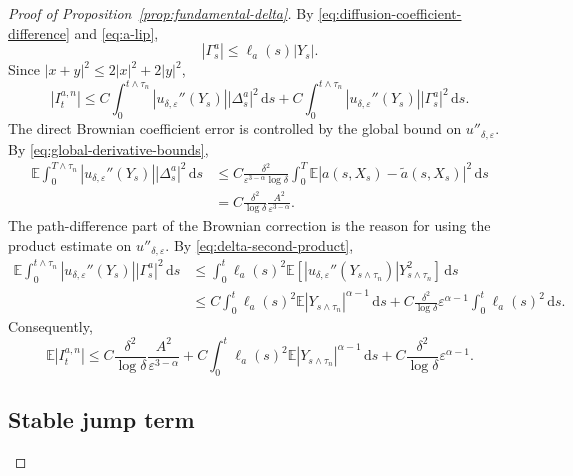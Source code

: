 \documentclass[11pt]{article}
\newcommand{\E}{\mathbb{E}}
\newcommand{\1}{\mathbf{1}}
\newcommand{\dd}{\,\mathrm{d}}
\newcommand{\wt}{\tilde}
\newcommand{\eps}{\varepsilon}
\begin{document}
\begin{proof}[Proof of Proposition~\ref{prop:fundamental-delta}]
By \eqref{eq:diffusion-coefficient-difference} and \eqref{eq:a-lip},
\[
  |\Gamma_s^a|\le \ell_a(s)|Y_s|.
\]
Since $|x+y|^2\le2|x|^2+2|y|^2$,
\[
|I_t^{a,n}|\le C\int_0^{t\wedge\tau_n} |u_{\delta,\eps}''(Y_s)||\Delta_s^a|^2\dd s
+C\int_0^{t\wedge\tau_n} |u_{\delta,\eps}''(Y_s)||\Gamma_s^a|^2\dd s.
\]
The direct Brownian coefficient error is controlled by the global bound on $u''_{\delta,\eps}$. By \eqref{eq:global-derivative-bounds},
\begin{align*}
\E\int_0^{T\wedge\tau_n} |u_{\delta,\eps}''(Y_s)||\Delta_s^a|^2\dd s
&\le C\frac{\delta^2}{\eps^{3-\alpha}\log\delta}
\int_0^T\E |a(s,X_s)-\wt a(s,X_s)|^2\dd s\\
&=C\frac{\delta^2}{\log\delta}\frac{A^2}{\eps^{3-\alpha}}.
\end{align*}
The path-difference part of the Brownian correction is the reason for using the product estimate on $u''_{\delta,\eps}$. By \eqref{eq:delta-second-product},
\begin{align*}
\E\int_0^{t\wedge\tau_n} |u_{\delta,\eps}''(Y_s)||\Gamma_s^a|^2\dd s
&\le \int_0^t \ell_a(s)^2\E\left[|u_{\delta,\eps}''(Y_{s\wedge\tau_n})|Y_{s\wedge\tau_n}^2\right]\dd s\\
&\le C\int_0^t \ell_a(s)^2\E |Y_{s\wedge\tau_n}|^{\alpha-1}\dd s
+C\frac{\delta^2}{\log\delta}\eps^{\alpha-1}\int_0^t \ell_a(s)^2\dd s.
\end{align*}
Consequently,
\begin{equation}\label{eq:brownian-estimate}
\E |I_t^{a,n}|
\le C\frac{\delta^2}{\log\delta}\frac{A^2}{\eps^{3-\alpha}}
+C\int_0^t \ell_a(s)^2\E|Y_{s\wedge\tau_n}|^{\alpha-1}\dd s
+C\frac{\delta^2}{\log\delta}\eps^{\alpha-1}.
\end{equation}

\subsection{Stable jump term}
\label{subsec:stable-term}


\end{proof}
\end{document}

